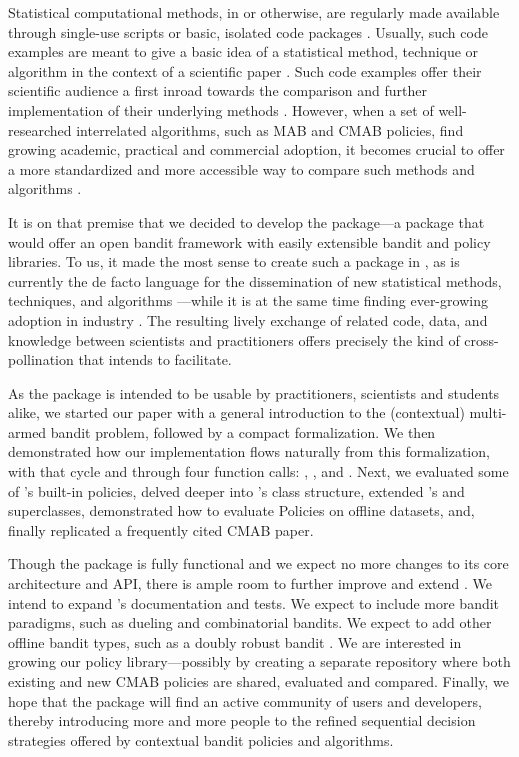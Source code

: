 \documentclass{jss}
\begin{document}
Statistical computational methods, in  or otherwise, are regularly made available through single-use scripts or basic, isolated code packages \citep{Gandrud2016}. Usually, such code examples are meant to give a basic idea of a statistical method, technique or algorithm in the context of a scientific paper \citep{Stodden2013}. Such code examples offer their scientific audience a first inroad towards the comparison and further implementation of their underlying methods \citep{Buckheit1995}. However, when a set of well-researched interrelated algorithms, such as MAB and CMAB policies, find growing academic, practical and commercial adoption, it becomes crucial to offer a more standardized and more accessible way to compare such methods and algorithms \citep{Mesirov2010}.

It is on that premise that we decided to develop the   package---a package that would offer an open bandit framework with easily extensible bandit and policy libraries. To us, it made the most sense to create such a package in  \citep{RCore}, as  is currently the de facto language for the dissemination of new statistical methods, techniques, and algorithms \citep{Tippmann2015}---while it is at the same time finding ever-growing adoption in industry \citep{2012}. The resulting lively exchange of  related code, data, and knowledge between scientists and practitioners offers precisely the kind of cross-pollination that  intends to facilitate.

As the package is intended to be usable by practitioners, scientists and students alike, we started our paper with a general introduction to the (contextual) multi-armed bandit problem, followed by a compact formalization. We then demonstrated how our implementation flows naturally from this formalization, with  that cycle  and  through four function calls: , ,  and . Next, we evaluated some of 's built-in policies, delved deeper into 's class structure, extended 's  and  superclasses, demonstrated how to evaluate Policies on offline datasets, and, finally replicated a frequently cited CMAB paper.

Though the package is fully functional and we expect no more changes to its core architecture and API, there is ample room to further improve and extend . We intend to expand 's documentation and tests. We expect to include more bandit paradigms, such as dueling and combinatorial bandits. We expect to add other offline bandit types, such as a doubly robust bandit \citep{Dudik2011}. We are interested in growing our policy library---possibly by creating a separate repository where both existing and new CMAB policies are shared, evaluated and compared. Finally, we hope that the package will find an active community of users and developers, thereby introducing more and more people to the refined sequential decision strategies offered by contextual bandit policies and algorithms.
\end{document}

